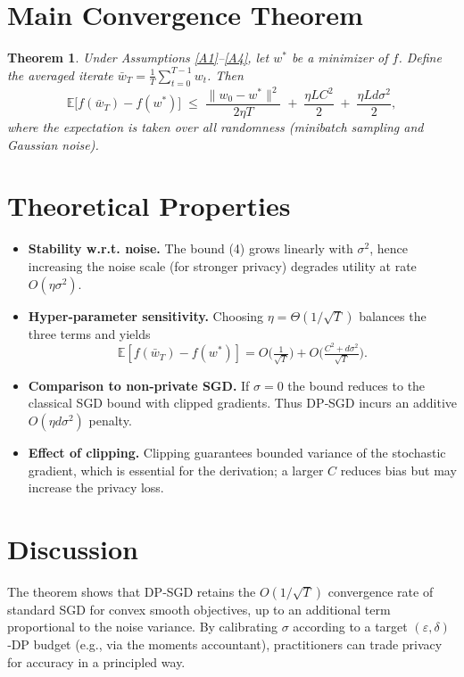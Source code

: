 \documentclass{article}
\newtheorem{theorem}{Theorem}
\newcommand{\EE}{\mathbb{E}}
\begin{document}
\section*{Main Convergence Theorem}
\begin{theorem}\label{thm:main}
Under Assumptions \ref{A1}–\ref{A4}, let $w^{*}$ be a minimizer of $f$.
Define the averaged iterate $\bar w_T=\frac{1}{T}\sum_{t=0}^{T-1}w_t$.
Then
\[
\EE\!\bigl[f(\bar w_T)-f(w^{*})\bigr]
\;\le\;
\frac{\|w_0-w^{*}\|^{2}}{2\eta T}
\;+\;
\frac{\eta L C^{2}}{2}
\;+\;
\frac{\eta L d\sigma^{2}}{2},
\tag{4}
\]
where the expectation is taken over all randomness (minibatch sampling and Gaussian noise).
\end{theorem}

\section*{Theoretical Properties}
\begin{itemize}
\item \textbf{Stability w.r.t. noise.} The bound (4) grows linearly with $\sigma^{2}$,
hence increasing the noise scale (for stronger privacy) degrades utility at rate $O(\eta\sigma^{2})$.
\item \textbf{Hyper‑parameter sensitivity.}
Choosing $\eta =\Theta(1/\sqrt{T})$ balances the three terms and yields
\[
\EE[f(\bar w_T)-f(w^{*})]=O\!\bigl(\tfrac{1}{\sqrt{T}}\bigr)
+O\!\bigl(\tfrac{C^{2}+d\sigma^{2}}{\sqrt{T}}\bigr).
\]
\item \textbf{Comparison to non‑private SGD.}
If $\sigma=0$ the bound reduces to the classical SGD bound with clipped gradients.
Thus DP‑SGD incurs an additive $O(\eta d\sigma^{2})$ penalty.
\item \textbf{Effect of clipping.}
Clipping guarantees bounded variance of the stochastic gradient, which is essential for the
derivation; a larger $C$ reduces bias but may increase the privacy loss.
\end{itemize}

\section*{Discussion}
The theorem shows that DP‑SGD retains the $O(1/\sqrt{T})$ convergence rate of standard SGD
for convex smooth objectives, up to an additional term proportional to the noise variance.
By calibrating $\sigma$ according to a target $(\varepsilon,\delta)$‑DP budget (e.g., via the
moments accountant), practitioners can trade privacy for accuracy in a principled way.
\end{document}
